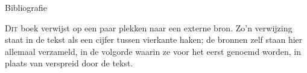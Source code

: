 \vspace*{0.4cm}
{\handfont\fontsize{60}{60}\selectfont\color{terracotta}Bibliografie\par}
\vspace{8pt}{\color{terracotta}\rule{2.6cm}{0.5pt}\;\raisebox{-0.2ex}{$\scriptstyle\blacklozenge$}}\par
\vspace{1.4em}

\lettrine{D}{it} boek verwijst op een paar plekken naar een externe bron.
Zo'n verwijzing staat in de tekst als een cijfer tussen vierkante haken;
de bronnen zelf staan hier allemaal verzameld, in de volgorde waarin ze
voor het eerst genoemd worden, in plaats van verspreid door de tekst.

\printbibliography[heading=none]
